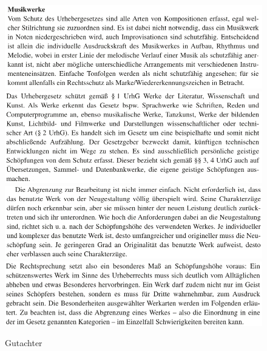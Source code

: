 \documentclass[a4paper, 11pt]{article}
\begin{document}
\begin{figure}
\centering
\includegraphics[width=1\textwidth]{../musikwerke.png}
\includegraphics[width=1\textwidth]{../werk.png}
\includegraphics[width=1\textwidth]{../schoepfungshoeheA.png}
\includegraphics[width=1\textwidth]{../schoepfungshoeheB.png}
\caption{Gutachter}
\label{img:Urteil}
\end{figure}
\end{document}
